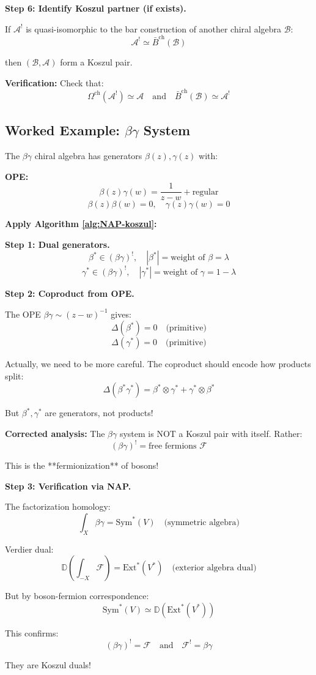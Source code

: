 \begin{algorithm}
\textbf{Step 6: Identify Koszul partner (if exists).}

If $\mathcal{A}^!$ is quasi-isomorphic to the bar construction of another chiral algebra $\mathcal{B}$:
$$\mathcal{A}^! \simeq \bar{B}^{\text{ch}}(\mathcal{B})$$

then $(\mathcal{B}, \mathcal{A})$ form a Koszul pair.

\textbf{Verification:} Check that:
$$\Omega^{\text{ch}}(\mathcal{A}^!) \simeq \mathcal{A} \quad \text{and} \quad \bar{B}^{\text{ch}}(\mathcal{B}) \simeq \mathcal{A}^!$$
\end{algorithm}

\subsection{Worked Example: $\beta\gamma$ System}

\begin{computation}\label{comp:betagamma-dual}
The $\beta\gamma$ chiral algebra has generators $\beta(z), \gamma(z)$ with:

\textbf{OPE:}
$$\beta(z) \gamma(w) = \frac{1}{z-w} + \text{regular}$$
$$\beta(z) \beta(w) = 0, \quad \gamma(z) \gamma(w) = 0$$

\textbf{Apply Algorithm \ref{alg:NAP-koszul}:}

\textbf{Step 1: Dual generators.}
$$\beta^* \in (\beta\gamma)^!, \quad |\beta^*| = \text{weight of } \beta = \lambda$$
$$\gamma^* \in (\beta\gamma)^!, \quad |\gamma^*| = \text{weight of } \gamma = 1-\lambda$$

\textbf{Step 2: Coproduct from OPE.}

The OPE $\beta \gamma \sim (z-w)^{-1}$ gives:
$$\Delta(\beta^*) = 0 \quad \text{(primitive)}$$
$$\Delta(\gamma^*) = 0 \quad \text{(primitive)}$$

Actually, we need to be more careful. The coproduct should encode how products split:
$$\Delta(\beta^* \gamma^*) = \beta^* \otimes \gamma^* + \gamma^* \otimes \beta^*$$

But $\beta^*, \gamma^*$ are generators, not products!

\textbf{Corrected analysis:} The $\beta\gamma$ system is NOT a Koszul pair with itself. Rather:
$$(\beta\gamma)^! = \text{free fermions } \mathcal{F}$$

This is the **fermionization** of bosons!

\textbf{Step 3: Verification via NAP.}

The factorization homology:
$$\int_X \beta\gamma = \text{Sym}^*(V) \quad \text{(symmetric algebra)}$$

Verdier dual:
$$\mathbb{D}\left(\int_{-X} \mathcal{F}\right) = \text{Ext}^*(V^*) \quad \text{(exterior algebra dual)}$$

But by boson-fermion correspondence:
$$\text{Sym}^*(V) \simeq \mathbb{D}(\text{Ext}^*(V^*))$$

This confirms:
$$(\beta\gamma)^! = \mathcal{F} \quad \text{and} \quad \mathcal{F}^! = \beta\gamma$$

They are Koszul duals!
\end{computation}

